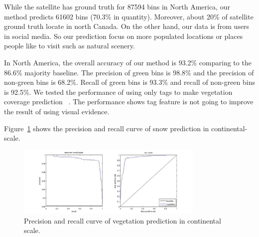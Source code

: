
While the satellite has ground truth for 87594 bins in North America, our method predicts 61602 bins (70.3\% in quantity). Moreover, about 20\% of satellite ground truth locate in north Canada. On the other hand, our data is from users in social media. So our prediction focus on more populated locations or places people like to visit such as natural scenery.

In North America, the overall accuracy of our method is 93.2\% comparing to the 86.6\% majority baseline. The precision of green bins is 98.8\% and the precision of non-green bins is 68.2\%. Recall of green bins is 93.3\% and recall of non-green bins is 92.5\%. We tested the performance of using only tags to make vegetation coverage prediction ~\cite{ecology2012www}. The performance shows tag
feature is not going to improve the result of using visual evidence.


Figure~\ref{fig:curvevege} shows the precision and recall curve of snow prediction in continental-scale.
\begin{figure}
\begin{center}

\includegraphics[width=0.80\textwidth]{curvevege.jpg}


\end{center}
\vspace{-24pt}
\caption{Precision and recall curve of vegetation prediction in continental scale.}
\label{fig:curvevege}
\vspace{-12pt}
\end{figure}

%
%
%



